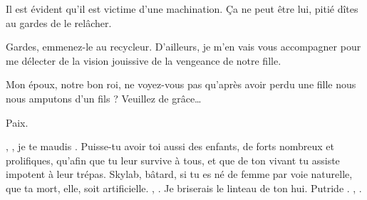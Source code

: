 \begin{drama}
  \reinespeaks Il est évident qu’il est victime d’une machination. Ça ne peut être lui, pitié dîtes au gardes de le relâcher.

  \roispeaks Gardes, emmenez-le au recycleur. D’ailleurs, je m’en vais vous accompagner pour me délecter de la vision jouissive de la vengeance de notre fille.

  \reinespeaks {} Mon époux, notre bon roi, ne voyez-vous pas qu’après avoir perdu une fille nous nous amputons d’un fils ? Veuillez de grâce…

  \roispeaks {} Paix.



  \reinespeaks {} \elena, \elena, je te maudis \elena. Puisse-tu avoir toi aussi des enfants, de forts nombreux et prolifiques, qu’afin que tu leur survive à tous, et que de ton vivant tu assiste impotent à leur trépas. \elena Skylab, bâtard, si tu es né de femme par voie naturelle, que ta mort, elle, soit artificielle. \elena, \elena. Je briserais le linteau de ton hui. Putride \elena. \elena, \elena {}.

\end{drama}

